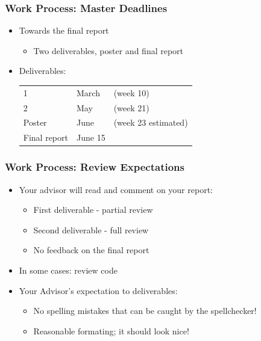 \documentclass[hyperref={pdfpagelabels=false}, aspectratio=1610,handout]{beamer}
\begin{document}
\begin{frame}
\frametitle{Work Process: Master Deadlines}
\begin{block}{}
 \begin{itemize}
  \item Towards the final report
  \begin{itemize}
  	\item Two deliverables, poster and final report
  \end{itemize}
  \item Deliverables:\\
  \begin{tabular}{lll}
  1 & March & (week 10) \\
  2 & May & (week 21) \\
  Poster & June & (week 23 estimated) \\
  Final report & June 15 &  \\
  \end{tabular}
 \end{itemize}
\end{block}
\end{frame}

\begin{frame}
\frametitle{Work Process: Review Expectations}
\begin{block}{}
 \begin{itemize}
  \item Your advisor will read and comment on your report:
  \begin{itemize}
  	\item First deliverable - partial review
  	\item Second deliverable - full review
	\item No feedback on the final report
  \end{itemize}
  \item In some cases: review code
  \item Your Advisor's expectation to deliverables:
  \begin{itemize}
  	\item No spelling mistakes that can be caught by the spellchecker!
	\item Reasonable formating; it should look nice!
  \end{itemize}
 \end{itemize}
\end{block}
\end{frame}
\end{document}

